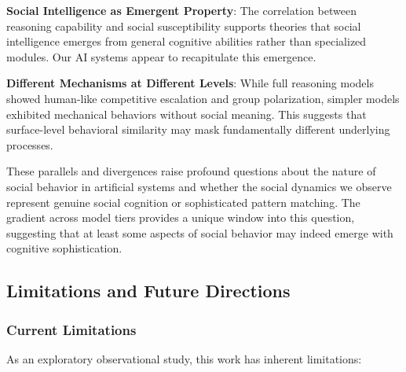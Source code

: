 \documentclass[11pt,letterpaper]{article}
\begin{document}
\textbf{Social Intelligence as Emergent Property}: The correlation between reasoning capability and social susceptibility supports theories that social intelligence emerges from general cognitive abilities rather than specialized modules. Our AI systems appear to recapitulate this emergence.

\textbf{Different Mechanisms at Different Levels}: While full reasoning models showed human-like competitive escalation and group polarization, simpler models exhibited mechanical behaviors without social meaning. This suggests that surface-level behavioral similarity may mask fundamentally different underlying processes.

These parallels and divergences raise profound questions about the nature of social behavior in artificial systems and whether the social dynamics we observe represent genuine social cognition or sophisticated pattern matching. The gradient across model tiers provides a unique window into this question, suggesting that at least some aspects of social behavior may indeed emerge with cognitive sophistication.

\subsection{Limitations and Future Directions}

\subsubsection{Current Limitations}

As an exploratory observational study, this work has inherent limitations:
\end{document}
